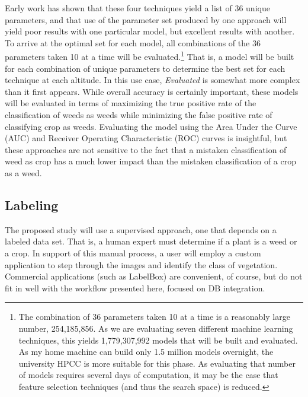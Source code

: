 \documentclass[12pt]{article}
\begin{document}
Early work has shown that these four techniques yield a list of 36 unique parameters, and that use of the parameter set produced by one approach will yield poor results with one particular model, but excellent results with another. To arrive at the optimal set for each model, all combinations of the 36 parameters taken 10 at a time will be evaluated.\footnote{The combination of 36 parameters taken 10 at a time is a reasonably large number, 254,185,856.  As we are evaluating seven different  machine learning techniques, this yields 1,779,307,992 models that will be built and evaluated. As my home machine can build only 1.5 million models overnight, the university HPCC is more suitable for this phase. As evaluating that number of models requires several days of computation, it may be the case that feature selection techniques (and thus the search space) is reduced.} That is, a model will be built for each combination of unique parameters to determine the best set for each technique at each altitude.
In this use case, \textit{Evaluated} is somewhat more complex than it first appears. While overall accuracy is certainly important, these models will be evaluated in terms of maximizing the true positive rate of the classification of weeds as weeds while minimizing the false positive rate of classifying crop as weeds. Evaluating the model using the Area Under the Curve (AUC) and Receiver Operating Characteristic (ROC) curves is insightful, but these approaches are not sensitive to the fact that a mistaken classification of weed as crop has a much lower impact than the mistaken classification of a crop as a weed.\\


\subsection{Labeling}
The proposed study will use a supervised approach, one that depends on a labeled data set. That is, a human expert must determine if a plant is a weed or a crop. In support of this manual process, a user will employ a custom application to step through the images and identify the class of vegetation. Commercial  applications (such as LabelBox) are convenient, of course, but do not fit in well with the workflow presented here, focused on DB integration.
\end{document}
